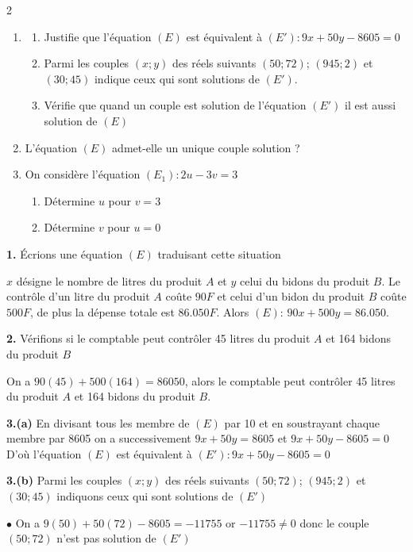 \begin{multicols*}{2}
\begin{enumerate}
  		\item 
  		\begin{enumerate}
  			\item  Justifie que l'équation $ (E) $ est équivalent à $ (E'): 9x + 50y - 8605=0 $
  			\item Parmi les couples $(x;y)$ des réels suivants $(50;72)$; $(945;2)$ et $(30;45)$ indique ceux qui sont solutions de $(E')$.
  			\item  Vérifie que quand un couple est solution de l'équation $(E')$ il est aussi solution de $(E)$
  		\end{enumerate}
  		\item L'équation $(E)$ admet-elle un unique couple solution ?
  		\item  On considère l'équation  $(E_{1}): 2u-3v=3$
  		\begin{enumerate}
  			\item  Détermine $u$ pour $v=3$
  			\item  Détermine $v$ pour $u=0$
  		\end{enumerate}
  	\end{enumerate}
  	\dure 
  	\resul
  	\textbf{1.} Écrions une équation $(E)$ traduisant cette situation
  	
  	$x$  désigne le nombre de litres du produit $A$ et $y$ celui du  bidons du produit $B$. Le contrôle d’un litre du produit $A$ coûte $90 F$ et celui d’un bidon du produit $B$ coûte $500 F$, de plus la dépense totale est $86.050 F$. Alors $(E)$: $90x+500y=86.050 $.
  	
  	\textbf{2.} Vérifions si le comptable peut contrôler 45 litres du produit $A$
  	et 164 bidons du produit $B$
  	
  	On a $90(45)+500(164)=86050 $, alors le comptable peut contrôler 45 litres du produit $A$ et 164 bidons du produit $B$.
  	
  	\textbf{3.(a)} En divisant tous les membre de  $ (E) $ par 10 et en soustrayant chaque membre par 8605 on a successivement      $9x+50y=8605$ et  $   9x + 50y - 8605=0 $ 
  	\\ D'où l'équation $ (E) $ est équivalent à  $ (E'): 9x + 50y - 8605=0 $ 
  	
  	\textbf{3.(b)} Parmi les couples $(x;y)$ des réels suivants $(50;72)$; $(945;2)$ et $(30;45)$ indiquons ceux qui sont solutions de $(E')$
  	
  	$\bullet$ On a $9(50)+50(72) - 8605=-11755$ or $-11755 \neq 0$ donc le couple  $(50;72)$ n'est pas solution de $(E')$
  	

\end{multicols*}
